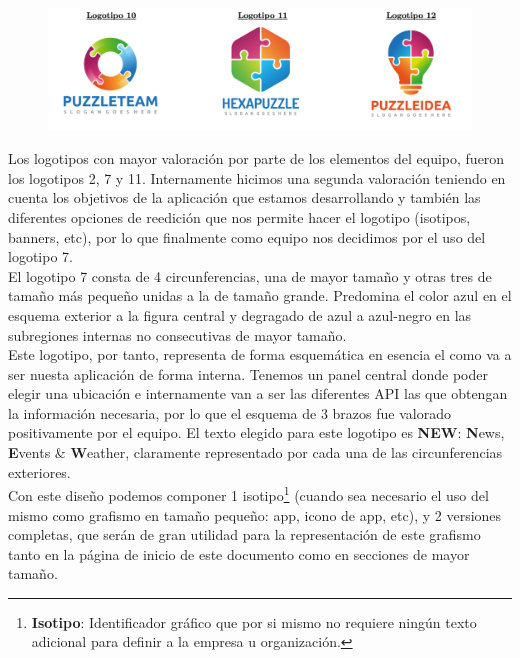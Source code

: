 \documentclass[../ei103948-project-documentation.tex]{subfiles}
\begin{document}
                            \begin{figure}[H]
                                \begin{center}
                                    \hspace*{-5mm}
                                \includegraphics[scale=0.16]{images/Logos4.png}
                                \end{center}
                            \end{figure}
                    
                            Los logotipos con mayor valoración por parte de los elementos del equipo, fueron los logotipos 2, 7 y 11. Internamente hicimos una segunda valoración teniendo en cuenta los objetivos de la aplicación que estamos desarrollando y también las diferentes opciones de reedición que nos permite hacer el logotipo (isotipos, banners, etc), por lo que finalmente como equipo nos decidimos por el uso del logotipo 7.\\
                    
                            El logotipo 7 consta de 4 circunferencias, una de mayor tamaño y otras tres de tamaño más pequeño unidas a la de tamaño grande. Predomina el color azul en el esquema exterior a la figura central y degragado de azul a azul-negro en las subregiones internas no consecutivas de mayor tamaño.\\
                            
                            Este logotipo, por tanto, representa de forma esquemática en esencia el como va a ser nuesta aplicación de forma interna. Tenemos un panel central donde poder elegir una ubicación e internamente van a ser las diferentes API las que obtengan la información necesaria, por lo que el esquema de 3 brazos fue valorado positivamente por el equipo. El texto elegido para este logotipo es \textbf{NEW}: \textbf{N}ews, \textbf{E}vents \& \textbf{W}eather, claramente representado por cada una de las circunferencias exteriores.\\
                    
                            Con este diseño podemos componer 1 isotipo\footnote{\textbf{Isotipo}: Identificador gráfico que por si mismo no requiere ningún texto adicional para definir a la empresa u organización.} (cuando sea necesario el uso del mismo como grafismo en tamaño pequeño: app, icono de app, etc), y 2 versiones completas, que serán de gran utilidad para la representación de este grafismo tanto en la página de inicio de este documento como en secciones de mayor tamaño.\\
\end{document}
